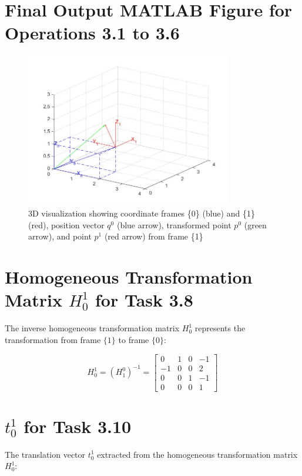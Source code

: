 \documentclass[11pt,a4paper]{article}
\begin{document}
\section{Final Output MATLAB Figure for Operations 3.1 to 3.6}

\begin{figure}[H]
    \centering
    \includegraphics[width=0.8\textwidth]{figure_1.jpg}
    \caption{3D visualization showing coordinate frames \{0\} (blue) and \{1\} (red), position vector $q^0$ (blue arrow), transformed point $p^0$ (green arrow), and point $p^1$ (red arrow) from frame \{1\}}
\end{figure}

\section{Homogeneous Transformation Matrix $H_0^1$ for Task 3.8}

The inverse homogeneous transformation matrix $H_0^1$ represents the transformation from frame $\{1\}$ to frame $\{0\}$:

$$H_0^1 = (H_1^0)^{-1} = \begin{bmatrix}
0 & 1 & 0 & -1 \\
-1 & 0 & 0 & 2 \\
0 & 0 & 1 & -1 \\
0 & 0 & 0 & 1
\end{bmatrix}$$

\section{$t_0^1$ for Task 3.10}

The translation vector $t_0^1$ extracted from the homogeneous transformation matrix $H_0^1$:
\end{document}
